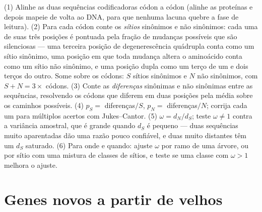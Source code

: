 \begin{method}[Estimar $d_{N}/d_{S}$]\label{met:b3:molecular-evolution:method}
(1) Alinhe as duas sequências codificadoras códon a códon (alinhe as
proteínas e depois mapeie de volta ao DNA, para que nenhuma lacuna quebre
a fase de leitura). (2) Para cada códon conte os \emph{sítios} sinônimos
e não sinônimos: cada uma de suas três posições é pontuada pela fração de
mudanças possíveis que são silenciosas --- uma terceira posição de
degenerescência quádrupla conta como um sítio sinônimo, uma posição em
que toda mudança altera o aminoácido conta como um sítio não sinônimo, e
uma posição dupla como um terço de um e dois terços do outro. Some sobre
os códons: $S$ sítios sinônimos e $N$ não sinônimos, com $S + N = 3 \times$ códons. (3) Conte as \emph{diferenças} sinônimas e não sinônimas
entre as sequências, resolvendo os códons que diferem em duas posições
pela média sobre os caminhos possíveis. (4) $p_{S} = $ diferenças$/S$,
$p_{N} = $ diferenças$/N$; corrija cada um para múltiplos acertos com
Jukes--Cantor. (5) $\omega =
d_{N}/d_{S}$; teste $\omega \ne 1$ contra a
variância amostral, que é grande quando $d_{S}$ é pequeno --- duas
sequências muito aparentadas dão uma razão pouco confiável, e duas muito
distantes têm um $d_{S}$ saturado. (6) Para onde e quando: ajuste
$\omega$ por ramo de uma árvore, ou por sítio com uma mistura de classes
de sítios, e teste se uma classe com $\omega > 1$ melhora o ajuste.
\end{method}

\section{Genes novos a partir de velhos}

